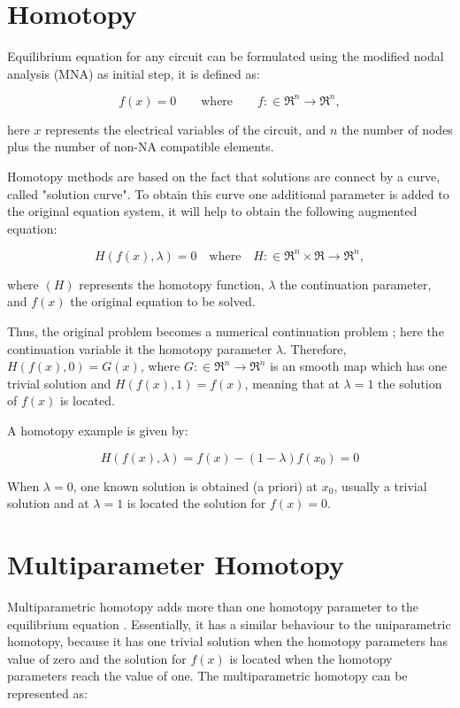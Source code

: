 \documentclass[conference,letterpaper,twocolumn]{IEEEtran}
\begin{document}
\section{Homotopy}
Equilibrium equation for any circuit can be formulated using the modified nodal analysis (MNA) \cite{mnaxx} as initial step, it is defined as:

\begin{equation}
{f}({x})={0} \qquad \text{where} \qquad f:\in \mathfrak{R}^n \to  \mathfrak{R}^n,
\label{fx}
\end{equation}

here $x$ represents the electrical variables of the circuit, and $n$ the number of nodes plus the number of non-NA compatible elements.

Homotopy methods are based on the fact that solutions are connect by a curve, called "solution curve". To obtain this curve one additional parameter is added to the original equation system, it will help to obtain the following augmented equation:

{\small
\begin{equation}
{H}({f}({x}),\lambda )={0}  \quad \text{where} \quad {H}: \in \mathfrak{R}^n \times  \mathfrak{R} \to \mathfrak{R}^n,
\label{homotopia}
\end{equation}}

where $(H)$ represents the homotopy function, $\lambda$ the continuation parameter, and ${f}({x})$ the original equation to be solved.

Thus, the original problem becomes a numerical continuation problem \cite{homo_richter}; here the continuation variable it the homotopy parameter $\lambda$. Therefore, ${H}({f}({x}),0)={G}({x})$, where ${G}: \in \mathfrak{R}^n \to  \mathfrak{R}^n$ is an smooth map which has one trivial solution and ${H}({f}({x}),1)={f}({x})$, meaning that at $\lambda=1$ the solution of ${f}({x})$ is located.

A homotopy example is given by:

\begin{equation}
{H}({f}({x}),\lambda ) =
{f}({x})-(1-\lambda ){f}({x}_{0}) = 0
\label{hexampl}
\end{equation}

When $\lambda =0$, one known solution is obtained (a priori) at ${x}_{0}$, usually a trivial solution and at $\lambda =1$ is located the solution for ${f}({x})=0$. 

\section{Multiparameter Homotopy}
Multiparametric homotopy adds more than one homotopy parameter to the equilibrium equation \cite{homo_DWolfMulti}. Essentially, it has a similar behaviour to the uniparametric homotopy, because it has one trivial solution when the homotopy parameters has value of zero and the solution for $f(x)$ is located when the homotopy parameters reach the value of one. The multiparametric homotopy can be represented as:
\end{document}
